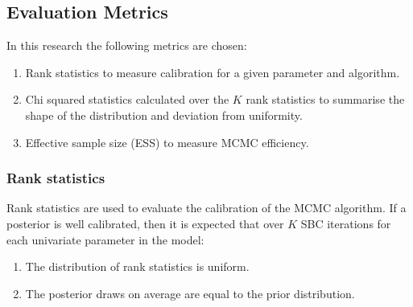 \documentclass[12pt, a4paper]{article}
\begin{document}
        

    \subsection{Evaluation Metrics}
        In this research the following metrics are chosen:

        \begin{enumerate}
            \item Rank statistics to measure calibration for a given parameter and algorithm.
            
            \item Chi squared statistics calculated over the $K$ rank statistics to summarise the shape of the distribution and deviation from uniformity.

            \item Effective sample size (ESS) to measure MCMC efficiency.
        \end{enumerate}

        \subsubsection{Rank statistics}
            Rank statistics are used to evaluate the calibration of the MCMC algorithm. If a posterior is well calibrated, then it is expected that over $K$ SBC iterations for each univariate parameter in the model:

            \begin{enumerate}
                \item The distribution of rank statistics is uniform.
                \item The posterior draws on average are equal to the prior distribution.
            \end{enumerate}
\end{document}
